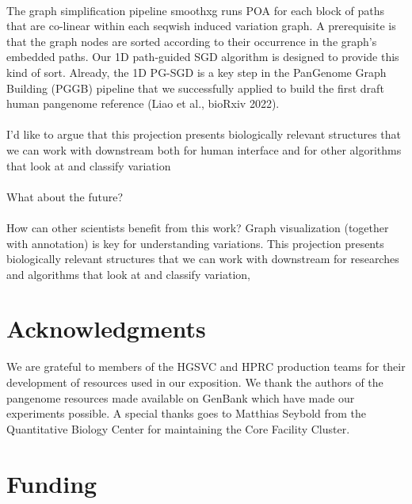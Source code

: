 \documentclass{bioinfo}
\theoremstyle{definition}
\begin{document}
    \paragraph{}
    The graph simplification pipeline smoothxg runs POA for each block of paths that are co-linear within each seqwish induced variation graph.
    A prerequisite is that the graph nodes are sorted according to their occurrence in the graph's embedded paths.
    Our 1D path-guided SGD algorithm is designed to provide this kind of sort.
    Already, the 1D PG-SGD is a key step in the PanGenome Graph Building (PGGB) pipeline that we successfully applied to build the first draft human pangenome reference (Liao et al., bioRxiv 2022).

    \paragraph{}
    I'd like to argue that this projection presents biologically relevant structures that we can work with downstream
    both for human interface
    and for other algorithms that look at and classify variation

    \paragraph{}
    What about the future?

    \paragraph{}
    How can other scientists benefit from this work?
    Graph visualization (together with annotation) is key for understanding variations.
    This projection presents biologically relevant structures that we can work with downstream for researches and algorithms that look at and classify variation,

    \section*{Acknowledgments}

    We are grateful to members of the HGSVC and HPRC production teams for their development of resources used in our exposition.
    We thank the authors of the pangenome resources made available on GenBank which have made our experiments possible.
    A special thanks goes to Matthias Seybold from the Quantitative Biology Center for maintaining the Core Facility Cluster.

    \section*{Funding}
\end{document}
